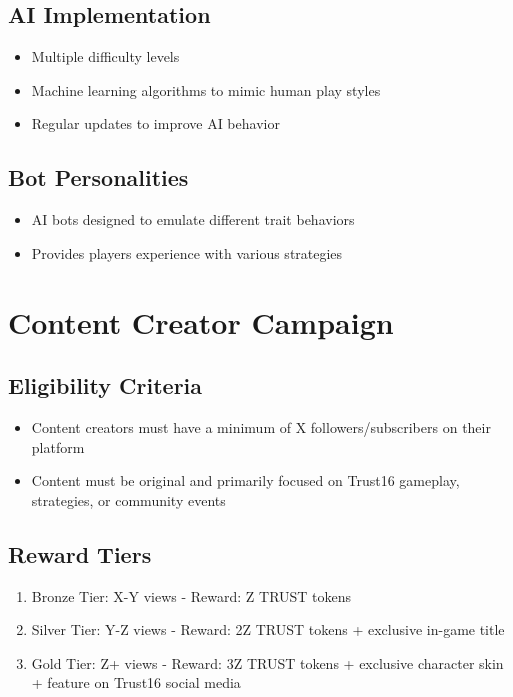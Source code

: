 \documentclass[12pt,a4paper]{article}
\begin{document}
\subsection{AI Implementation}
\begin{itemize}
    \item Multiple difficulty levels
    \item Machine learning algorithms to mimic human play styles
    \item Regular updates to improve AI behavior
\end{itemize}

\subsection{Bot Personalities}
\begin{itemize}
    \item AI bots designed to emulate different trait behaviors
    \item Provides players experience with various strategies
\end{itemize}

\section{Content Creator Campaign}

\subsection{Eligibility Criteria}
\begin{itemize}
    \item Content creators must have a minimum of X followers/subscribers on their platform
    \item Content must be original and primarily focused on Trust16 gameplay, strategies, or community events
\end{itemize}

\subsection{Reward Tiers}
\begin{enumerate}
    \item Bronze Tier: X-Y views - Reward: Z TRUST tokens
    \item Silver Tier: Y-Z views - Reward: 2Z TRUST tokens + exclusive in-game title
    \item Gold Tier: Z+ views - Reward: 3Z TRUST tokens + exclusive character skin + feature on Trust16 social media
\end{enumerate}
\end{document}
